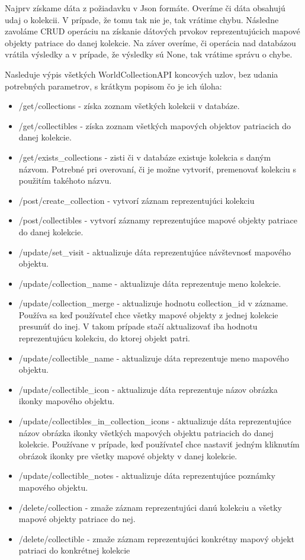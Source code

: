 Najprv získame dáta z požiadavku v Json formáte. Overíme či dáta obsahujú udaj o kolekcii. V prípade, že tomu tak nie je, tak vrátime chybu.
Následne zavoláme  CRUD operáciu na získanie dátových prvokov reprezentujúcich 
mapové objekty patriace do danej kolekcie. Na záver overíme, či operácia nad databázou vrátila výsledky a v prípade, že výsledky sú None, tak vrátime správu o chybe. 

Nasleduje výpis všetkých WorldCollectionAPI koncových uzlov, bez udania potrebných parametrov, s krátkym popisom čo je ich úloha: 
\begin{itemize}
      \item /get/collections - získa zoznam všetkých kolekcii v databáze. 
      \item /get/collectibles - získa zoznam všetkých mapových objektov patriacich do danej kolekcie. 
      \item /get/exists\_collections - zisti či v databáze existuje kolekcia s daným názvom. 
            Potrebné pri overovaní, či je možne vytvoriť, premenovať kolekciu s použitím takéhoto názvu. 
      \item /post/create\_collection - vytvorí záznam reprezentujúci kolekciu 
      \item /post/collectibles - vytvorí záznamy reprezentujúce mapové objekty patriace do danej kolekcie. 
      \item /update/set\_visit - aktualizuje dáta reprezentujúce návštevnosť mapového objektu. 
      \item /update/collection\_name - aktualizuje dáta reprezentuje meno kolekcie. 
      \item /update/collection\_merge - aktualizuje hodnotu collection\_id v zázname.  Používa sa keď používateľ chce všetky mapové objekty z jednej kolekcie presunúť do inej. 
            V takom prípade stačí aktualizovať iba hodnotu reprezentujúcu kolekciu, do ktorej objekt patri. 
      \item /update/collectible\_name - aktualizuje dáta reprezentuje meno mapového objektu. 
      \item /update/collectible\_icon - aktualizuje dáta reprezentuje názov obrázka ikonky mapového objektu. 
      \item /update/collectibles\_in\_collection\_icons - aktualizuje dáta reprezentujúce názov obrázka ikonky všetkých mapových objektu patriacich do danej kolekcie. 
            Používane v prípade, keď používateľ chce nastaviť jedným kliknutím obrázok ikonky pre všetky mapové objekty v danej kolekcie. 
      \item /update/collectible\_notes - aktualizuje dáta reprezentujúce poznámky mapového objektu. 
      \item /delete/collection - zmaže záznam reprezentujúci danú kolekciu a všetky mapové objekty patriace do nej. 
      \item /delete/collectible - zmaže záznam reprezentujúci konkrétny mapový objekt patriaci do konkrétnej kolekcie 
\end{itemize}

